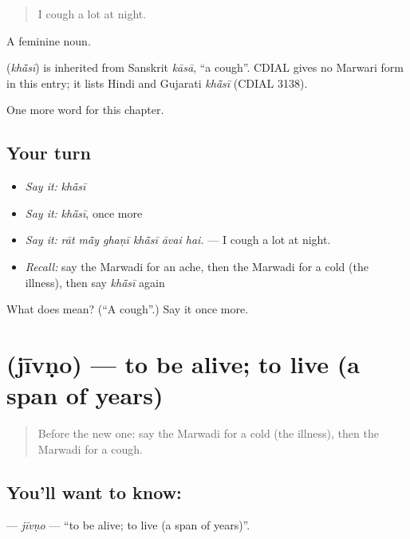 \begin{quote}
I cough a lot at night.
\end{quote}

A feminine noun.

\begin{cousinweb}
\textbf{} (\emph{khā̃sī}) is inherited from Sanskrit \emph{kāsā}, \textquotedblleft{}a cough\textquotedblright{}. CDIAL gives no Marwari form in this entry; it lists Hindi and Gujarati \emph{khā̃sī} (CDIAL 3138).
\end{cousinweb}

\begin{grammarlens}[title={What you've built}]
One more word for this chapter.
\end{grammarlens}

\subsection*{Your turn}
\begin{itemize}
\raggedright
  \item \emph{Say it:} \emph{khā̃sī}
  \item \emph{Say it:} \emph{khā̃sī}, once more
  \item \emph{Say it:} \emph{rāt mā̃y ghaṇī khā̃sī āvai hai.} — I cough a lot at night.
  \item \emph{Recall:} say the Marwadi for an ache, then the Marwadi for a cold (the illness), then say \emph{khā̃sī} again
\end{itemize}

\begin{tcolorbox}[breakable,colback=teal!4,colframe=teal!35!black,title={Before you move on}]
What does  mean? (\textquotedblleft{}A cough\textquotedblright{}.) Say it once more.
\end{tcolorbox}
\section[\texorpdfstring{\mw{जीवणो} (jīvṇo)}{जीवणो (jīvṇo)}]{ (jīvṇo) — to be alive; to live (a span of years)}

\label{lesson:MW-C253-jivno}



\begin{quote}
Before the new one: say the Marwadi for a cold (the illness), then the Marwadi for a cough.
\end{quote}

\subsection*{You'll want to know: }
\textbf{} — \emph{jīvṇo} — \textquotedblleft{}to be alive; to live (a span of years)\textquotedblright{}.

